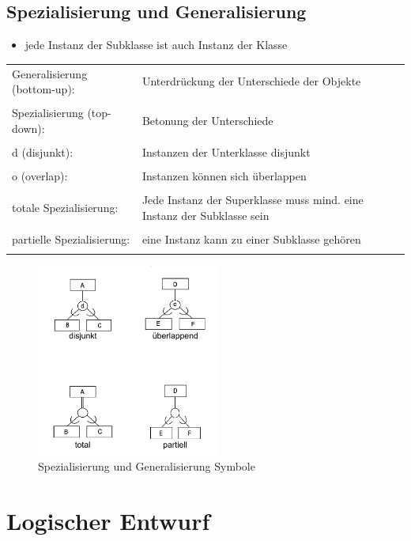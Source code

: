 \documentclass[a4paper]{article}
\begin{document}
\subsection{Spezialisierung und Generalisierung}
\begin{itemize}
    \item jede Instanz der Subklasse ist auch Instanz der Klasse
\end{itemize}
\begin{tabular}{l p{10cm}}
    Generalisierung (bottom-up): &  Unterdrückung der Unterschiede der Objekte \\
    & \\
    Spezialisierung (top-down): & Betonung der Unterschiede \\
    & \\
    d (disjunkt): & Instanzen der Unterklasse disjunkt \\
    & \\
    o (overlap): & Instanzen können sich überlappen \\
    & \\
    totale Spezialisierung: & Jede Instanz der Superklasse muss mind. eine Instanz der Subklasse sein \\
    & \\
    partielle Spezialisierung: & eine Instanz kann zu einer Subklasse gehören \\
    & \\
\end{tabular}

\begin{figure}[htp]
    \centering
    \includegraphics[width=6cm]{images/SpezialisierungGeneralisierung.png}
    \caption{Spezialisierung und Generalisierung Symbole}
    \label{fig:SpezialisierungGeneralisierung}
\end{figure}

\newpage

\section{Logischer Entwurf}
\end{document}
